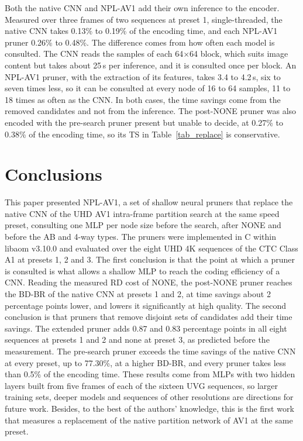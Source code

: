 \documentclass[conference]{IEEEtran}
\begin{document}
Both the native CNN and NPL-AV1 add their own inference to the encoder. Measured
over three frames of two sequences at preset 1, single-threaded, the native CNN takes 0.13\%
to 0.19\% of the encoding time, and each NPL-AV1 pruner 0.26\% to 0.48\%. The
difference
comes from how often each model is consulted. The CNN reads the samples of each
64$\times$64 block, which suits image content but takes about 25\,\textmu{}s per
inference, and it is consulted once per block. An NPL-AV1 pruner, with the
extraction of its features, takes 3.4 to 4.2\,\textmu{}s, six to seven times
less, so it can be consulted at every node of 16 to 64 samples, 11 to 18 times
as often as the CNN. In both cases, the time savings come from the removed
candidates and not from the inference. The post-NONE pruner was also encoded
with the pre-search pruner present but unable to decide, at 0.27\% to 0.38\% of
the encoding time, so its TS in Table~\ref{tab_replace} is conservative.

\section{Conclusions}

This paper presented NPL-AV1, a set of shallow neural pruners that replace the
native CNN of the UHD AV1 intra-frame partition search at the same speed preset,
consulting one MLP per node size before the search, after NONE and before the AB
and 4-way types. The pruners were implemented in C within libaom v3.10.0 and evaluated
over the eight UHD 4K sequences of the CTC Class A1 at presets 1, 2 and 3.
The first conclusion is that the point at which a pruner is consulted is what
allows a shallow MLP to reach the coding efficiency of a CNN. Reading the
measured RD cost of NONE, the post-NONE pruner reaches the BD-BR of the native
CNN at presets 1 and 2, at time savings
about 2 percentage points lower, and lowers it significantly at high quality.
The second conclusion is that pruners that remove disjoint sets of candidates
add their time savings. The extended pruner adds 0.87 and 0.83 percentage points
in all eight sequences at presets 1 and 2 and none at preset 3, as predicted
before the measurement. The pre-search pruner exceeds the time savings of the
native CNN at every preset, up to 77.30\%, at a higher BD-BR, and every pruner
takes less than 0.5\% of the encoding time. These results come from MLPs with
two hidden layers built from five frames of each of the sixteen UVG sequences,
so larger training sets, deeper models and sequences of other resolutions are
directions for future work. Besides, to the best of the authors'
knowledge, this is the first work that measures a replacement of the native
partition network of AV1 at the same preset.
\end{document}
